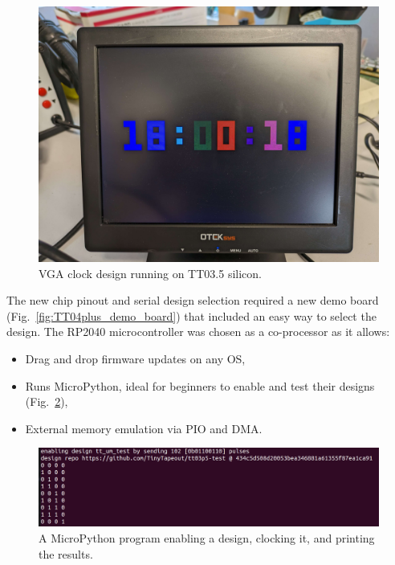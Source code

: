 \begin{figure}[htp]
\centering
\includegraphics[width=\columnwidth]{./Figs/tt3p5 vga clock.jpg}
\caption{VGA clock design running on TT03.5 silicon.}
\label{fig:VGA_clock_design_TT03_5_silicon}
\end{figure}

The new chip pinout and serial design selection required a new demo board (Fig.~\ref{fig:TT04plus_demo_board}) that included an easy way to select the design.
The RP2040 microcontroller was chosen as a co-processor as it allows:

\begin{itemize}
\item Drag and drop firmware updates on any OS,
\item Runs MicroPython\cite{micropython}, ideal for beginners to enable and test their designs (Fig.~\ref{fig:micropython_program}),
\item External memory emulation via PIO and DMA.
\end{itemize}

\begin{figure}[htp]
\centering
\includegraphics[width=\columnwidth]{./Figs/tt3p5 enable design.png}
\caption{A MicroPython program\cite{demofirmwaretest} enabling a design, clocking it, and printing the results.}
\label{fig:micropython_program}
\end{figure}

